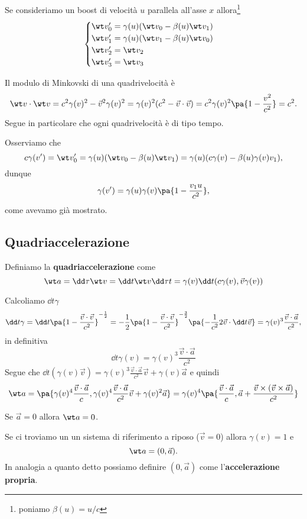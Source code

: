 \noindent Se consideriamo un boost di velocit\`a $u$ parallela all'asse $x$ allora\footnote{poniamo $\beta(u)=u/c$}
\[\begin{cases}
\wt v_0'=\gamma(u)(\wt v_0-\beta(u)\wt v_1)\\
\wt v_1'=\gamma(u)(\wt v_1-\beta(u)\wt v_0)\\
\wt v_2'=\wt v_2\\
\wt v_3'=\wt v_3
\end{cases}\]

\begin{remark}
Il modulo di Minkovski di una quadrivelocit\`a \`e
\[\wt v\cdot \wt v=c^2\gamma(v)^2-\vec v^2\gamma(v)^2=\gamma(v)^2(c^2-\vec v\cdot \vec v)=c^2\gamma(v)^2\pa{1-\frac{v^2}{c^2}}=c^2.\]
Segue in particolare che ogni quadrivelocit\`a \`e di tipo tempo.
\end{remark}

\begin{remark}
Osserviamo che
\[c\gamma(v')=\wt v_0'=\gamma(u)(\wt v_0-\beta(u)\wt v_1)=\gamma(u)(c\gamma(v)-\beta(u)\gamma(v)v_1),\]
dunque
\[\gamma(v')=\gamma(u)\gamma(v)\pa{1-\frac{v_1 u}{c^2}},\]
come avevamo gi\`a mostrato.
\end{remark}

\subsection{Quadriaccelerazione}
\begin{definition}[Quadriaccelerazione]
Definiamo la \textbf{quadriaccelerazione} come
\[\wt a=\dd\tau{\wt v}=\dd t{\wt v}\dd\tau t=\gamma(v)\dd t{}(c\gamma(v),\vec v\gamma(v))\]
\end{definition}
Calcoliamo $\dd t\gamma$
\[\dd t\gamma=\dd t{}\pa{1-\frac{\vec v\cdot \vec v}{c^2}}^{-\frac12}=-\frac12\pa{1-\frac{\vec v\cdot \vec v}{c^2}}^{-\frac32}\pa{-\frac1{c^2}2\vec v\cdot \dd t{\vec v}}=\gamma(v)^3\frac{\vec v\cdot \vec a}{c^2},\]
in definitiva
\[\boxed{\dd t{\gamma(v)}=\gamma(v)^3\frac{\vec v\cdot \vec a}{c^2}}\]
Segue che $\dd t{}(\gamma(v)\vec v)=\gamma(v)^3\frac{\vec v\cdot \vec a}{c^2}\vec v+\gamma(v)\vec a$ e quindi
\[\wt a=\pa{\gamma(v)^4\frac{\vec v\cdot \vec a}{c},\gamma(v)^4\frac{\vec v\cdot \vec a}{c^2}\vec v+\gamma(v)^2\vec a}=\gamma(v)^4\pa{\frac{\vec v\cdot \vec a}{c},\vec a+\frac{\vec v\times(\vec v\times \vec a)}{c^2}}\]
\begin{remark}
Se $\vec a=0$ allora $\wt a=0$.
\end{remark}

\begin{remark}
Se ci troviamo un un sistema di riferimento a riposo ($\vec v=0$) allora $\gamma(v)=1$ e
\[\wt a=(0,\vec a).\]
In analogia a quanto detto possiamo definire $(0,\vec a)$ come l'\textbf{accelerazione propria}.
\end{remark}

